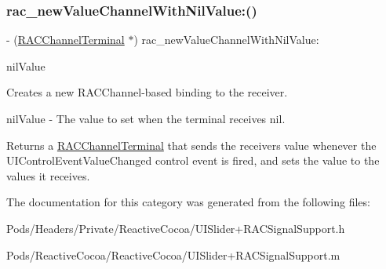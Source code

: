 \subsubsection{\texorpdfstring{rac\+\_\+new\+Value\+Channel\+With\+Nil\+Value\+:()}{rac\_newValueChannelWithNilValue:()}\hspace{0.1cm}{\footnotesize\ttfamily [3/3]}}
{\footnotesize\ttfamily -\/ (\mbox{\hyperlink{interface_r_a_c_channel_terminal}{R\+A\+C\+Channel\+Terminal}} $\ast$) rac\+\_\+new\+Value\+Channel\+With\+Nil\+Value\+: \begin{DoxyParamCaption}\item[{(N\+S\+Number $\ast$)}]{nil\+Value }\end{DoxyParamCaption}}

Creates a new R\+A\+C\+Channel-\/based binding to the receiver.

nil\+Value -\/ The value to set when the terminal receives {\ttfamily nil}.

Returns a \mbox{\hyperlink{interface_r_a_c_channel_terminal}{R\+A\+C\+Channel\+Terminal}} that sends the receiver\textquotesingle{}s value whenever the U\+I\+Control\+Event\+Value\+Changed control event is fired, and sets the value to the values it receives. 

The documentation for this category was generated from the following files\+:\begin{DoxyCompactItemize}
\item 
Pods/\+Headers/\+Private/\+Reactive\+Cocoa/U\+I\+Slider+\+R\+A\+C\+Signal\+Support.\+h\item 
Pods/\+Reactive\+Cocoa/\+Reactive\+Cocoa/U\+I\+Slider+\+R\+A\+C\+Signal\+Support.\+m\end{DoxyCompactItemize}
